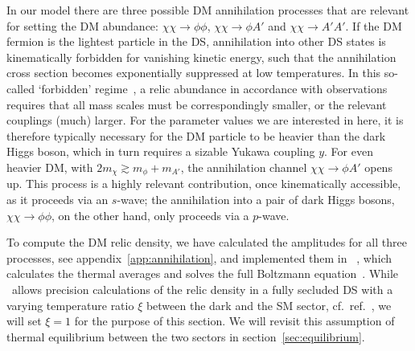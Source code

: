 In our model there are three possible \ac{DM} annihilation processes that are relevant for setting the \ac{DM} abundance: $\chi \chi \to \phi \phi$, $\chi \chi \to \phi A'$ and $\chi \chi \to A' A'$. If the \ac{DM} fermion is the lightest particle in the \ac{DS}, annihilation
into other \ac{DS} states is kinematically forbidden for vanishing kinetic energy, such that the annihilation cross section becomes exponentially suppressed at low temperatures. In this so-called `forbidden' regime~\cite{DAgnolo:2015ujb}, a relic abundance in accordance with observations requires that all mass scales must  be correspondingly smaller, or the relevant couplings (much) larger. For the parameter values we are interested in here, it is therefore typically necessary for the \ac{DM} particle to be heavier than the dark Higgs boson, which in turn requires a sizable Yukawa coupling $y$. For even heavier \ac{DM}, with $2 m_\chi \gtrsim m_\phi + m_{A'}$, the annihilation channel $\chi \chi \to \phi A'$ opens up. This process is a highly relevant contribution, once kinematically accessible, as it proceeds via an $s$-wave; the annihilation into a pair of dark Higgs bosons, $\chi\chi\to\phi\phi$, on the other hand,
only proceeds via a $p$-wave. 

To compute the \ac{DM} relic density, we have calculated the amplitudes for all three processes, see appendix~\ref{app:annihilation}, and implemented them in \ds~\cite{Bringmann:2018lay}, which  calculates the thermal averages and solves the full Boltzmann equation~\cite{Gondolo:1990dk}. While \ds\ allows precision calculations of the relic density in a fully secluded \ac{DS} with a varying  temperature ratio $\xi$ between the dark and the \ac{SM} sector, cf.~ref.~\cite{Bringmann:2020mgx}, we will set  $\xi = 1$ for the purpose of this section. We will revisit this assumption of thermal equilibrium between the two sectors in section~\ref{sec:equilibrium}.

